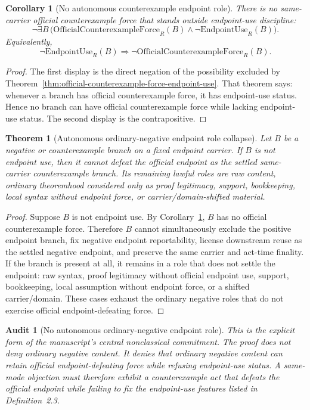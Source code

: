 \documentclass[11pt]{article}
\newtheorem{theorem}{Theorem}[section]
\newtheorem{corollary}{Corollary}[section]
\newtheorem{audit}{Audit}[section]
\newcommand{\EndpointUse}{\mathrm{EndpointUse}}
\newcommand{\OfficialCxForce}{\mathrm{OfficialCounterexampleForce}}
\begin{document}
\begin{corollary}[No autonomous counterexample endpoint role]\label{cor:no-autonomous-counterexample-endpoint-role}
There is no same-carrier official counterexample force that stands outside endpoint-use discipline:
\[
\neg\exists B\,\bigl(\OfficialCxForce_R(B)\wedge \neg\EndpointUse_R(B)\bigr).
\]
Equivalently,
\[
\neg\EndpointUse_R(B)\Rightarrow \neg\OfficialCxForce_R(B).
\]
\end{corollary}

\begin{proof}
The first display is the direct negation of the possibility excluded by Theorem~\ref{thm:official-counterexample-force-endpoint-use}.  That theorem says: whenever a branch has official counterexample force, it has endpoint-use status.  Hence no branch can have official counterexample force while lacking endpoint-use status.  The second display is the contrapositive.
\end{proof}

\begin{theorem}[Autonomous ordinary-negative endpoint role collapse]\label{thm:autonomous-negative-role-collapse}
Let \(B\) be a negative or counterexample branch on a fixed endpoint carrier.  If \(B\) is not endpoint use, then it cannot defeat the official endpoint as the settled same-carrier counterexample branch.  Its remaining lawful roles are raw content, ordinary theoremhood considered only as proof legitimacy, support, bookkeeping, local syntax without endpoint force, or carrier/domain-shifted material.
\end{theorem}

\begin{proof}
Suppose \(B\) is not endpoint use.  By Corollary~\ref{cor:no-autonomous-counterexample-endpoint-role}, \(B\) has no official counterexample force.  Therefore \(B\) cannot simultaneously exclude the positive endpoint branch, fix negative endpoint reportability, license downstream reuse as the settled negative endpoint, and preserve the same carrier and act-time finality.  If the branch is present at all, it remains in a role that does not settle the endpoint: raw syntax, proof legitimacy without official endpoint use, support, bookkeeping, local assumption without endpoint force, or a shifted carrier/domain.  These cases exhaust the ordinary negative roles that do not exercise official endpoint-defeating force.
\end{proof}

\begin{audit}[No autonomous ordinary-negative endpoint role]
This is the explicit form of the manuscript's central nonclassical commitment.  The proof does not deny ordinary negative content.  It denies that ordinary negative content can retain official endpoint-defeating force while refusing endpoint-use status.  A same-mode objection must therefore exhibit a counterexample act that defeats the official endpoint while failing to fix the endpoint-use features listed in Definition~2.3.
\end{audit}
\end{document}
